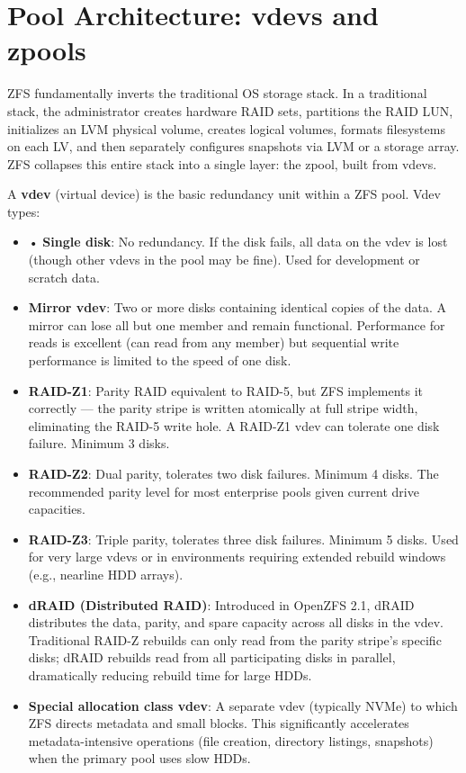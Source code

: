 \section{Pool Architecture: vdevs and zpools}
ZFS fundamentally inverts the traditional OS storage stack. In a traditional stack, the administrator creates hardware RAID sets, partitions the RAID LUN, initializes an LVM physical volume, creates logical volumes, formats filesystems on each LV, and then separately configures snapshots via LVM or a storage array. ZFS collapses this entire stack into a single layer: the zpool, built from vdevs.

A \textbf{vdev} (virtual device) is the basic redundancy unit within a ZFS pool. Vdev types:

\begin{itemize}
  \item • \textbf{Single disk}: No redundancy. If the disk fails, all data on the vdev is lost (though other vdevs in the pool may be fine). Used for development or scratch data.
  \item \textbf{Mirror vdev}: Two or more disks containing identical copies of the data. A mirror can lose all but one member and remain functional. Performance for reads is excellent (can read from any member) but sequential write performance is limited to the speed of one disk.
  \item \textbf{RAID-Z1}: Parity RAID equivalent to RAID-5, but ZFS implements it correctly --- the parity stripe is written atomically at full stripe width, eliminating the RAID-5 write hole. A RAID-Z1 vdev can tolerate one disk failure. Minimum 3 disks.
  \item \textbf{RAID-Z2}: Dual parity, tolerates two disk failures. Minimum 4 disks. The recommended parity level for most enterprise pools given current drive capacities.
  \item \textbf{RAID-Z3}: Triple parity, tolerates three disk failures. Minimum 5 disks. Used for very large vdevs or in environments requiring extended rebuild windows (e.g., nearline HDD arrays).
  \item \textbf{dRAID (Distributed RAID)}: Introduced in OpenZFS 2.1, dRAID distributes the data, parity, and spare capacity across all disks in the vdev. Traditional RAID-Z rebuilds can only read from the parity stripe's specific disks; dRAID rebuilds read from all participating disks in parallel, dramatically reducing rebuild time for large HDDs.
  \item \textbf{Special allocation class vdev}: A separate vdev (typically NVMe) to which ZFS directs metadata and small blocks. This significantly accelerates metadata-intensive operations (file creation, directory listings, snapshots) when the primary pool uses slow HDDs.
\end{itemize}

